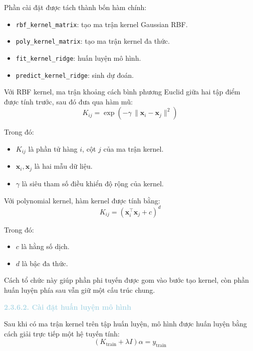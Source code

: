 Phần cài đặt được tách thành bốn hàm chính:
\begin{itemize}
    \item \texttt{rbf\_kernel\_matrix}: tạo ma trận kernel Gaussian RBF.
    \item \texttt{poly\_kernel\_matrix}: tạo ma trận kernel đa thức.
    \item \texttt{fit\_kernel\_ridge}: huấn luyện mô hình.
    \item \texttt{predict\_kernel\_ridge}: sinh dự đoán.
\end{itemize}

Với RBF kernel, ma trận khoảng cách bình phương Euclid giữa hai tập điểm được tính trước, sau đó đưa qua hàm mũ:
\begin{equation}
    K_{ij} = \exp\!\left(-\gamma\,\|\mathbf{x}_i - \mathbf{x}_j\|^2\right)
\end{equation}

Trong đó:
\begin{itemize}
    \item $K_{ij}$ là phần tử hàng $i$, cột $j$ của ma trận kernel.
    \item $\mathbf{x}_i, \mathbf{x}_j$ là hai mẫu dữ liệu.
    \item $\gamma$ là siêu tham số điều khiển độ rộng của kernel.
\end{itemize}

Với polynomial kernel, hàm kernel được tính bằng:
\begin{equation}
    K_{ij} = (\mathbf{x}_i^\top \mathbf{x}_j + c)^d
\end{equation}

Trong đó:
\begin{itemize}
    \item $c$ là hằng số dịch.
    \item $d$ là bậc đa thức.
\end{itemize}

Cách tổ chức này giúp phần phi tuyến được gom vào bước tạo kernel, còn phần huấn luyện phía sau vẫn giữ một cấu trúc chung.

\noindent\textcolor{lightblue}{\textbf{2.3.6.2. Cài đặt huấn luyện mô hình}}

Sau khi có ma trận kernel trên tập huấn luyện, mô hình được huấn luyện bằng cách giải trực tiếp một hệ tuyến tính:
\begin{equation}
    (K_{\mathrm{train}} + \lambda I)\alpha = y_{\mathrm{train}}
\end{equation}

